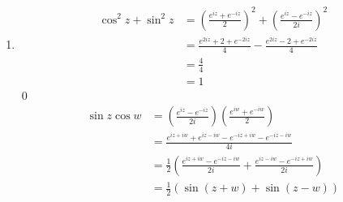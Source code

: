 \documentclass[fleqn, a4paper, 11pt, oneside]{amsart}
\theoremstyle{definition}
\theoremstyle{theorem}
\begin{document}
\begin{solution}
	\begin{enumerate}[leftmargin=*]
		\setcounter{enumi}{0}
		\item
			\begin{align*}
				\cos^2 z + \sin^2 z & = \left( \frac{e^{i z} + e^{-i z}}{2} \right)^2 + \left( \frac{e^{i z} - e^{-i z}}{2 i} \right)^2 \\
                                                    & = \frac{e^{2 i z} + 2 + e^{-2 i z}}{4} - \frac{e^{2 i z} - 2 + e^{-2 i z}}{4}                     \\
                                                    & = \frac{4}{4}                                                                                     \\
                                                    & = 1
			\end{align*}
			\qed
			\begin{align*}
				\sin z \cos w & = \left( \frac{e^{i z} - e^{-i z}}{2 i} \right) \left( \frac{e^{i w} + e^{-i w}}{2} \right)                          \\
                                              & = \frac{e^{i z + i w} + e^{i z - i w} - e^{-i z + i w} - e^{-i z - i w}}{4 i}                                        \\
                                              & = \frac{1}{2} \left( \frac{e^{i z + i w} - e^{-i z - i w}}{2 i} + \frac{e^{i z - i w} - e^{-i z + i w}}{2 i} \right) \\
                                              & = \frac{1}{2} \left( \sin(z + w) + \sin(z - w) \right)
			\end{align*}
	\end{enumerate}
\end{solution}
\end{document}
